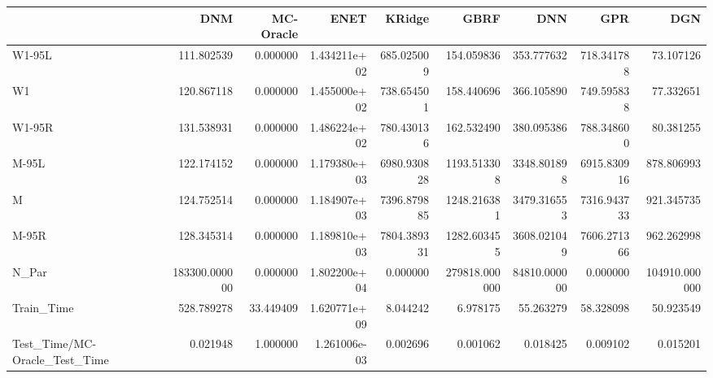 \begin{tabular}{lrrrrrrrr}
\toprule
{} &            DNM &  MC-Oracle &          ENET &       KRidge &           GBRF &           DNN &          GPR &            DGN \\
\midrule
W1-95L                        &     111.802539 &   0.000000 &  1.434211e+02 &   685.025009 &     154.059836 &    353.777632 &   718.341788 &      73.107126 \\
W1                            &     120.867118 &   0.000000 &  1.455000e+02 &   738.654501 &     158.440696 &    366.105890 &   749.595838 &      77.332651 \\
W1-95R                        &     131.538931 &   0.000000 &  1.486224e+02 &   780.430136 &     162.532490 &    380.095386 &   788.348600 &      80.381255 \\
M-95L                         &     122.174152 &   0.000000 &  1.179380e+03 &  6980.930828 &    1193.513308 &   3348.801898 &  6915.830916 &     878.806993 \\
M                             &     124.752514 &   0.000000 &  1.184907e+03 &  7396.879885 &    1248.216381 &   3479.316553 &  7316.943733 &     921.345735 \\
M-95R                         &     128.345314 &   0.000000 &  1.189810e+03 &  7804.389331 &    1282.603455 &   3608.021049 &  7606.271366 &     962.262998 \\
N\_Par                         &  183300.000000 &   0.000000 &  1.802200e+04 &     0.000000 &  279818.000000 &  84810.000000 &     0.000000 &  104910.000000 \\
Train\_Time                    &     528.789278 &  33.449409 &  1.620771e+09 &     8.044242 &       6.978175 &     55.263279 &    58.328098 &      50.923549 \\
Test\_Time/MC-Oracle\_Test\_Time &       0.021948 &   1.000000 &  1.261006e-03 &     0.002696 &       0.001062 &      0.018425 &     0.009102 &       0.015201 \\
\bottomrule
\end{tabular}
